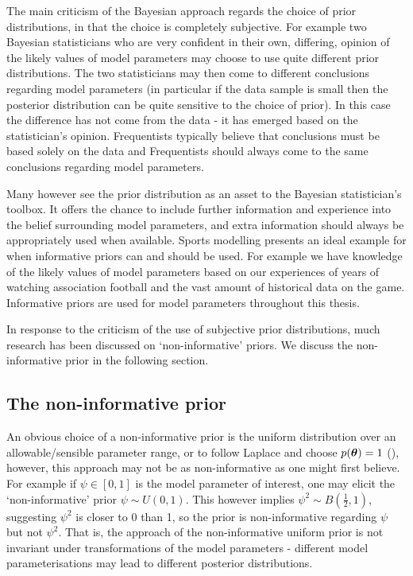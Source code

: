 The main criticism of the Bayesian approach regards the choice of prior distributions, in that the choice is completely
subjective. For example two Bayesian statisticians who are very confident in their own, differing, opinion of the likely
values of model parameters may choose to use quite different prior distributions. The two statisticians may then come to
different conclusions regarding model parameters (in particular if the data sample is small then the posterior
distribution can be quite sensitive to the choice of prior). In this case the difference has not come from the data - it
has emerged based on the statistician's opinion. Frequentists typically believe that conclusions must be based solely on
the data and Frequentists should always come to the same conclusions regarding model parameters.

Many however see the prior distribution as an asset to the Bayesian statistician's toolbox. It offers the chance to
include further information and experience into the belief surrounding model parameters, and extra information should
always be appropriately used when available. Sports modelling presents an ideal example for when informative priors can
and should be used. For example we have knowledge of the likely values of model parameters based on our experiences of
years of watching association football and the vast amount of historical data on the game. Informative priors are used
for model parameters throughout this thesis.

In response to the criticism of the use of subjective prior distributions, much research has been discussed on
`non-informative' priors. We discuss the non-informative prior in the following section.

\subsection{The non-informative prior}

An obvious choice of a non-informative prior is the uniform distribution over an allowable/sensible parameter range, or
to follow Laplace and choose \(p(\boldsymbol{\theta}) = 1\) (\cite{berger1992}), however, this approach may not be as
non-informative as one might first believe. For example if \(\psi \in [0, 1]\) is the model parameter of interest, one
may elicit the `non-informative' prior \(\psi \sim U(0, 1)\). This however implies \(\psi^2 \sim B(\frac{1}{2}, 1)\),
suggesting \(\psi^2\) is closer to 0 than 1, so the prior is non-informative regarding \(\psi\) but not \(\psi^2\). That
is, the approach of the non-informative uniform prior is not invariant under transformations of the model parameters -
different model parameterisations may lead to different posterior distributions.

